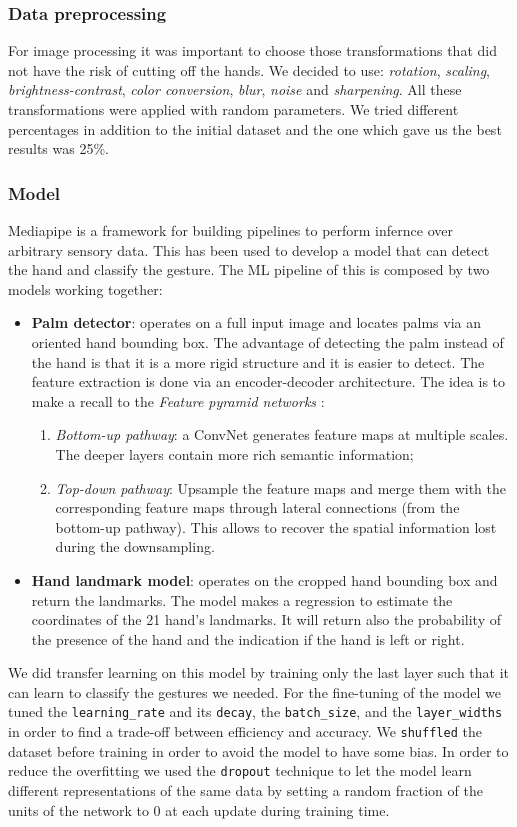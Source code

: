 \documentclass[10pt,twocolumn,letterpaper]{article}
\begin{document}
\subsubsection{Data preprocessing}
For image processing it was important to choose those transformations that did not have the risk of cutting off the hands. We decided to use: \textit{rotation}, \textit{scaling}, \textit{brightness-contrast}, \textit{color conversion}, \textit{blur}, \textit{noise} and \textit{sharpening}. All these transformations were applied with random parameters.
We tried different percentages in addition to the initial dataset and the one which gave us the best results was 25\%.  
\subsubsection{Model}
Mediapipe is a framework for building pipelines to perform infernce over arbitrary sensory data. This has been used to develop a model that can detect the hand and classify the gesture.
The ML pipeline of this is composed by two models working together:
\begin{itemize}
   \item \textbf{Palm detector}: operates on a full input image and locates palms via an oriented hand bounding box. The advantage of detecting the palm instead of the hand 
   is that it is a more rigid structure and it is easier to detect. The feature extraction is done via an encoder-decoder architecture. The idea is to make a recall to the 
   \textit{Feature pyramid networks} \cite{lin2017featurepyramidnetworksobject}:
   \begin{enumerate}
      \item \textit{Bottom-up pathway}: a ConvNet generates feature maps at multiple scales. The deeper layers contain more rich semantic information;
      \item \textit{Top-down pathway}: Upsample the feature maps and merge them with the corresponding feature maps through lateral connections (from the bottom-up pathway).
      This allows to recover the spatial information lost during the downsampling.
   \end{enumerate}
   \item \textbf{Hand landmark model}: operates on the cropped hand bounding box and return the landmarks. 
   The model makes a regression to estimate the coordinates of the 21 hand's landmarks. It will return also the probability of the presence of the hand and 
   the indication if the hand is left or right.
\end{itemize}
We did transfer learning on this model by training only the last layer such that it can learn to classify the gestures we needed.
For the fine-tuning of the model we tuned the \texttt{learning\_rate} and its \texttt{decay}, 
the \texttt{batch\_size}, and the \texttt{layer\_widths} in order to find a trade-off between 
efficiency and accuracy.
We \texttt{shuffled} the dataset before training in order to avoid the model to have some bias.
In order to reduce the overfitting we used the \texttt{dropout} technique to 
let the model learn different representations of the same data by setting a random fraction of 
the units of the network to 0 at each update during training time.
\end{document}
